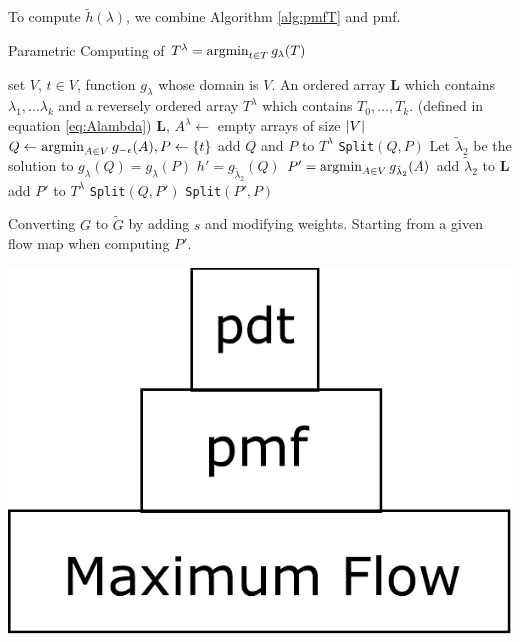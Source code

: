 \documentclass[portrait,final,a0paper,fontscale=0.3]{baposter}
\begin{document}
\begin{poster}
{\begin{multicols}{2}
To compute $\tilde{h}(\lambda)$, we combine Algorithm \ref{alg:pmfT} and \textsf{pmf}.
\begin{algorithm}[H]
	\caption{
		{\footnotesize
		Parametric Computing of $T^{\lambda} = \operatorname*{argmin}_{t\in T} g_{\lambda}(T)$
		}
	}\label{alg:pmfT}
	\begin{algorithmic}[1]
		\REQUIRE set $V$, $t \in V$, function $g_{\lambda}$ whose domain is $V$.
		\ENSURE An ordered array \textbf{L} which contains $\lambda_1, \dots \lambda_k$ and a reversely ordered array $T^{\lambda}$ which contains $T_0,\dots, T_k$. (defined in equation \eqref{eq:Alambda})
		\STATE \textbf{L}, $A^{\lambda} \leftarrow$ empty arrays of size $\lvert V\rvert$
		\STATE $Q \leftarrow \operatorname*{argmin}_{A\in V} g_{-\epsilon}(A), P \leftarrow \{ t \}$ \label{alg:uini}
		\STATE add $Q$ and $P$ to $T^{\lambda}$
		\STATE \texttt{Split}$(Q,P)$
		\STATE Let $\tilde{\lambda}_2$ be the solution to $g_{\lambda}(Q) =  g_{\lambda}(P)$
		\STATE $h' = g_{\tilde{\lambda}_2}(Q)$
		\STATE $P' =\operatorname*{argmin}_{A\in V} g_{\tilde{\lambda}_2}(A)$  \label{alg:Pap}
		\STATE add  $\tilde{\lambda}_2$ to $\mathbf{L}$
		\ELSE
		\STATE add $P'$ to $T^{\lambda}$ \label{alg:addP}
		\STATE \texttt{Split}$(Q,P')$
		\STATE \texttt{Split}$(P',P)$
		\ENDIF
		\ENDFUNCTION
	\end{algorithmic}
\end{algorithm}
{

}
\begin{multicols}{2}		
Converting $G$ to $\widetilde{G}$ by adding $s$ and modifying weights.
Starting from a given flow map when computing $P'$.

\includegraphics[width=0.65\linewidth]{img/pdt.pdf}
\end{multicols}
\end{multicols}

}

\end{poster}
\end{document}
